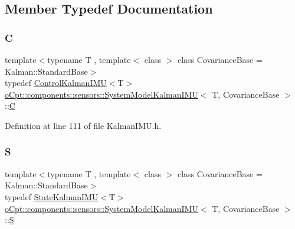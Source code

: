 \subsection{Member Typedef Documentation}
\hypertarget{classo_cpt_1_1components_1_1sensors_1_1_system_model_kalman_i_m_u_a5ed9fbeaeaa5a91116615f01a44b7c78}{}\label{classo_cpt_1_1components_1_1sensors_1_1_system_model_kalman_i_m_u_a5ed9fbeaeaa5a91116615f01a44b7c78} 
\subsubsection{\texorpdfstring{C}{C}}
{\footnotesize\ttfamily template$<$typename T , template$<$ class $>$ class Covariance\+Base = Kalman\+::\+Standard\+Base$>$ \\
typedef \hyperlink{classo_cpt_1_1components_1_1sensors_1_1_control_kalman_i_m_u}{Control\+Kalman\+I\+MU}$<$T$>$ \hyperlink{classo_cpt_1_1components_1_1sensors_1_1_system_model_kalman_i_m_u}{o\+Cpt\+::components\+::sensors\+::\+System\+Model\+Kalman\+I\+MU}$<$ T, Covariance\+Base $>$\+::\hyperlink{classo_cpt_1_1components_1_1sensors_1_1_system_model_kalman_i_m_u_a5ed9fbeaeaa5a91116615f01a44b7c78}{C}}



Definition at line 111 of file Kalman\+I\+M\+U.\+h.

\hypertarget{classo_cpt_1_1components_1_1sensors_1_1_system_model_kalman_i_m_u_a7dde4d4af9085109c0e3021aa38f42bc}{}\label{classo_cpt_1_1components_1_1sensors_1_1_system_model_kalman_i_m_u_a7dde4d4af9085109c0e3021aa38f42bc} 
\subsubsection{\texorpdfstring{S}{S}}
{\footnotesize\ttfamily template$<$typename T , template$<$ class $>$ class Covariance\+Base = Kalman\+::\+Standard\+Base$>$ \\
typedef \hyperlink{classo_cpt_1_1components_1_1sensors_1_1_state_kalman_i_m_u}{State\+Kalman\+I\+MU}$<$T$>$ \hyperlink{classo_cpt_1_1components_1_1sensors_1_1_system_model_kalman_i_m_u}{o\+Cpt\+::components\+::sensors\+::\+System\+Model\+Kalman\+I\+MU}$<$ T, Covariance\+Base $>$\+::\hyperlink{classo_cpt_1_1components_1_1sensors_1_1_system_model_kalman_i_m_u_a7dde4d4af9085109c0e3021aa38f42bc}{S}}




